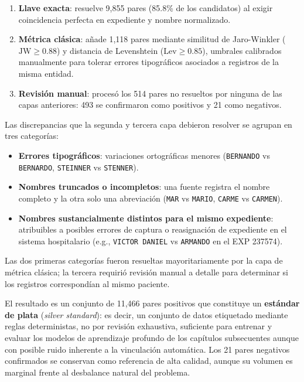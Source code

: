 \begin{enumerate}
    \item \textbf{Llave exacta}: resuelve 9,855 pares (85.8\% de los candidatos) al exigir coincidencia perfecta en expediente y nombre normalizado.
    \item \textbf{Métrica clásica}: añade 1,118 pares mediante similitud de Jaro-Winkler ($\text{JW} \geq 0.88$) y distancia de Levenshtein ($\text{Lev} \geq 0.85$), umbrales calibrados manualmente para tolerar errores tipográficos asociados a registros de la misma entidad.
    \item \textbf{Revisión manual}: procesó los 514 pares no resueltos por ninguna de las capas anteriores: 493 se confirmaron como positivos y 21 como negativos.
\end{enumerate}



Las discrepancias que la segunda y tercera capa debieron resolver se agrupan en tres categorías:
\begin{itemize}
    \item \textbf{Errores tipográficos}: variaciones ortográficas menores (\texttt{BERNANDO} vs \texttt{BERNARDO}, \texttt{STEINNER} vs \texttt{STENNER}).
    \item \textbf{Nombres truncados o incompletos}: una fuente registra el nombre completo y la otra solo una abreviación (\texttt{MAR} vs \texttt{MARIO}, \texttt{CARME} vs \texttt{CARMEN}).
    \item \textbf{Nombres sustancialmente distintos para el mismo expediente}: atribuibles a posibles errores de captura o reasignación de expediente en el sistema hospitalario (e.g., \texttt{VICTOR DANIEL} vs \texttt{ARMANDO} en el EXP 237574).
\end{itemize}
Las dos primeras categorías fueron resueltas mayoritariamente por la capa de métrica clásica; la tercera requirió revisión manual a detalle para determinar si los registros correspondían al mismo paciente.

El resultado es un conjunto de 11,466 pares positivos que constituye un \textbf{estándar de plata} (\textit{silver standard}): es decir, un conjunto de datos etiquetado mediante reglas deterministas, no por revisión exhaustiva, suficiente para entrenar y evaluar los modelos de aprendizaje profundo de los capítulos subsecuentes aunque con posible ruido inherente a la vinculación automática. Los 21 pares negativos confirmados se conservan como referencia de alta calidad, aunque su volumen es marginal frente al desbalance natural del problema.


